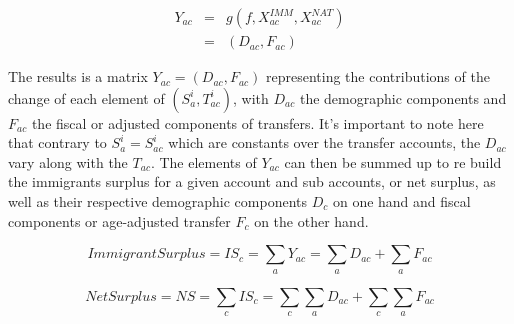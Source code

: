 \begin{eqnarray}
  Y_{ac}&=&g(f,X^{IMM}_{ac},X^{NAT}_{ac}) \nonumber \\
&=& (D_{ac}, F_{ac}) \label{eq:dc2}
\end{eqnarray}

The results is a matrix \( Y_{ac} = (D_{ac}, F_{ac}) \) representing the contributions of the change of each element of \( (S^{i}_a, T^{i}_{ac})\), with \( D_{ac}\) the demographic components and \( F_{ac}\) the fiscal or adjusted components of transfers.
It's important to note here that contrary to  \( S^{i}_{a}=S^{i}_{ac} \) which are constants over the transfer accounts, the \( D_{ac} \) vary along with the \(T_{ac}\).
The elements of \( Y_{ac} \) can then be summed up to re build the immigrants surplus for a given account and sub accounts, or net surplus, as well as their respective demographic components \( D_{c} \) on one hand and fiscal components or age-adjusted transfer \( F_{c} \) on the other hand.

\begin{equation}\label{eq:dc3}
  Immigrant Surplus =IS_{c} = \displaystyle\sum_{a}Y_{ac} = \displaystyle\sum_{a}D_{ac} + \displaystyle\sum_{a}F_{ac}
\end{equation}

\begin{equation}\label{eq:dc4}
  Net Surplus = NS = \displaystyle\sum_{c}IS_{c} = \displaystyle\sum_{c}\displaystyle\sum_{a}D_{ac} + \displaystyle\sum_{c}\displaystyle\sum_{a}F_{ac}
\end{equation}


